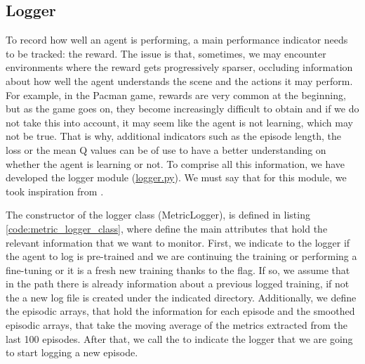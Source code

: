 \subsection{Logger}
To record how well an agent is performing, a main performance indicator needs to be tracked: the reward. The issue is that, sometimes, we may encounter environments where the reward gets progressively sparser, occluding information about how well the agent understands the scene and the actions it may perform. For example, in the Pacman game, rewards are very common at the beginning, but as the game goes on, they become increasingly difficult to obtain and if we do not take this into account, it may seem like the agent is not learning, which may not be true. That is why, additional indicators such as the episode length, the loss or the mean Q values can be of use to have a better understanding on whether the agent is learning or not. To comprise all this information, we have developed the logger module (\href{https://github.com/Javimh18/DL_TFM/blob/main/src/utils/logger.py}{logger.py}). We must say that for this module, we took inspiration from \cite{feng2022mario}.

The constructor of the logger class (MetricLogger), is defined in listing \ref{code:metric_logger_class}, where define the main attributes that hold the relevant information that we want to monitor. First, we indicate to the logger if the agent to log is pre-trained and we are continuing the training or performing a fine-tuning or it is a fresh new training thanks to the  flag. If so, we assume that in the  path there is already information about a previous logged training, if not the a new log file is created under the indicated directory. Additionally, we define the episodic arrays, that hold the information for each episode and the smoothed episodic arrays, that take the moving average of the metrics extracted from the last 100 episodes. After that, we call the  to indicate the logger that we are going to start logging a new episode.

